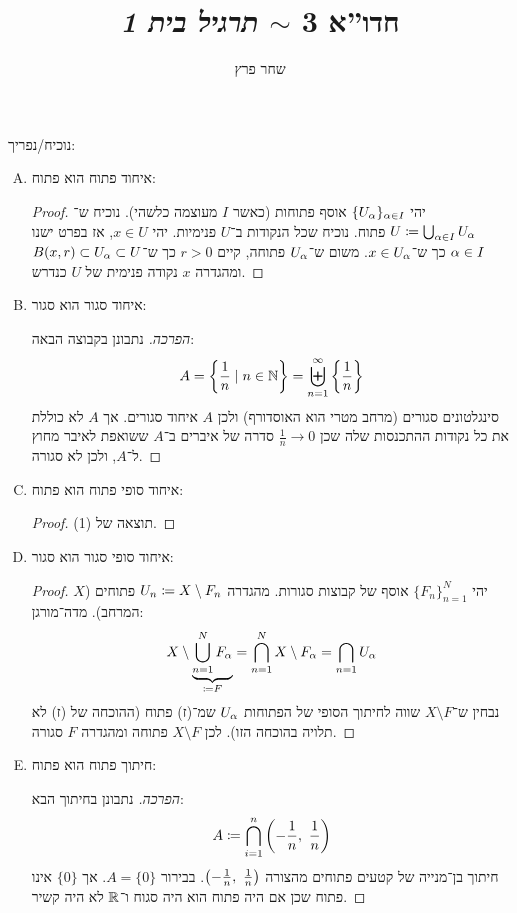 \documentclass[]{../../../../../tex/classes/homework}
\author{שחר פרץ}
\title{חדו''א 3 $\sim$ \textit{תרגיל בית 1}}
\begin{document}
	\maketitle
	\section{}
	נוכיח/נפריך: 
	\begin{enumerate}[(A)]
		\item איחוד פתוח הוא פתוח: \begin{proof}
			יהי $\{U_\alpha\}_{\alpha \in I}$ אוסף פתוחות (כאשר $I$ מעוצמה כלשהי). נוכיח ש־$ U \coloneqq \bigcup_{\alpha \in I} U_\alpha$ פתוח. נוכיח שכל הנקודות ב־$U$ פנימיות. יהי $x \in U$, אז בפרט ישנו $\alpha \in I$ כך ש־$x \in U_\alpha$. משום ש־$U_\alpha$ פתוחה, קיים $r > 0$ כך ש־$B(x, r) \subset U_\alpha \subset U$ ומהגדרה $x$ נקודה פנימית של $U$ כנדרש. 
		\end{proof}
		\item איחוד סגור הוא סגור: \begin{proof}[הפרכה]
			נתבונן בקבוצה הבאה: 
			\[ A = \left \{ \frac{1}{n} \mid n \in \mathbb{N} \right \} = \biguplus_{n = 1}^{\infty}\left \{ \frac{1}{n} \right \} \]
			סינגלטונים סגורים (מרחב מטרי הוא האוסדורף) ולכן $A$ איחוד סגורים. אך $A$ לא כוללת את כל נקודות ההתכנסות שלה שכן $\frac{1}{n} \to 0$ סדרה של איברים ב־$A$ ששואפת לאיבר מחוץ ל־$A$, ולכן לא סגורה. 
		\end{proof}
		\item איחוד סופי פתוח הוא פתוח: \begin{proof}
			תוצאה של (1). 
		\end{proof}
		\item איחוד סופי סגור הוא סגור: \begin{proof}
			יהי $\{F_n\}_{n = 1}^{N}$ אוסף של קבוצות סגורות. מהגדרה $U_n \coloneqq X \setminus F_n$ פתוחים ($X$ המרחב). מדה־מורגן: 
			\[ X \setminus \underbrace{\bigcup_{n = 1}^{N}F_\alpha}_{\coloneqq F} = \bigcap_{n = 1}^{N}X \setminus F_\alpha = \bigcap_{n = 1}U_\alpha \]
			נבחין ש־$X \setminus F$ שווה לחיתוך הסופי של הפתוחות $U_\alpha$ שמ־(ז) פתוח (ההוכחה של (ז) לא תלויה בהוכחה הזו). לכן $X \setminus F$ פתוחה ומהגדרה $F$ סגורה. 
		\end{proof}
		\item חיתוך פתוח הוא פתוח: \begin{proof}[הפרכה]
			נתבונן בחיתוך הבא: 
			\[ A \coloneqq \bigcap_{i = 1}^{n}\left ( -\frac{1}{n}, \ \frac{1}{n} \right ) \]
			חיתוך בן־מנייה של קטעים פתוחים מהצורה $\left ( -\frac{1}{n}, \ \frac{1}{n} \right )$. בבירור $A =\{0\}$. אך $\{0\}$ אינו פתוח שכן אם היה פתוח הוא היה סגוח ו־$\mathbb{R}$ לא היה קשיר. 
		\end{proof}

\end{enumerate}
\end{document}
